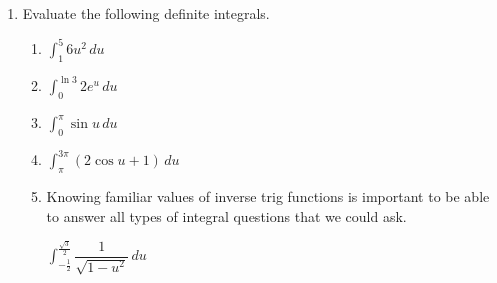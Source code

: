 \documentclass{article}
\begin{document}
\begin{enumerate}
\vfill 
\item Evaluate the following definite integrals.
\begin{enumerate}
    \item $\displaystyle \int_{1}^{5} 6u^2\,du\ $
    \vfill 
    \item $\displaystyle \int_{0}^{\ln3} 2e^u\,du\ $
        \vfill 
        \newpage
    \item $\displaystyle \int_{0}^{\pi} \sin u\,du\ $
        \vfill 
    \item $\displaystyle \int_{\pi}^{3\pi} (2\cos u+1)\,du\ $
        \vfill
    \item 
    \begin{workshop}
        Knowing familiar values of inverse trig functions is important to be able to answer all types of integral questions that we could ask.
    \end{workshop}
    $\displaystyle \int_{-\frac{1}{2}}^{\frac{\sqrt{3}}{2}} \dfrac{1}{\sqrt{1-u^2}}\,du\ $
        \vfill 
       

\end{enumerate}
\end{enumerate}
\end{document}
